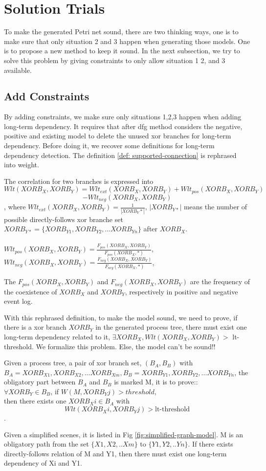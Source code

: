 \section{Solution Trials}
To make the generated Petri net sound, there are two thinking ways, one is to make sure that only situation 2 and 3 happen when generating those models. One is to propose a new method to keep it sound. 
In the next subsection, we try to solve this problem by giving constraints to only allow situation 1 2, and 3 available. 
\subsection{Add Constraints}
By adding constraints, we make sure only situations 1,2,3 happen when adding long-term dependency. It requires that after dfg method considers the negative, positive and existing model to delete the unused xor branches for long-term dependency. 
Before doing it, we recover some definitions for long-term dependency detection. 
The definition \ref{def: supported-connection} is rephrased into weight. 
\begin{definition} The correlation for two branches is expressed into
	\[Wlt(XORB_X,XORB_Y)= Wlt_{ext}(XORB_X, XORB_Y) + Wlt_{pos}(XORB_X, XORB_Y)\] \[ -Wlt_{neg}(XORB_X, XORB_Y)\], where 
	$Wlt_{ext}(XORB_X, XORB_Y)= \frac{1}{|XORB_Y*|}$, $|XORB_{Y*}|$ means the number of possible  directly-follows xor branche set $XORB_{Y*}=\{XORB_{Y1}, XORB_{Y2},...XORB_{Yn} \}$ after $XORB_X$. \\ \\
	$Wlt_{pos}(XORB_X, XORB_Y)= \frac{F_{pos}(XORB_X, XORB_Y)}{F_{pos}(XORB_X, *)}$, \\
	$Wlt_{neg}(XORB_X, XORB_Y)= \frac{F_{neg}(XORB_X, XORB_Y)}{F_{neg}(XORB_X, *)}$, \\	
\end{definition}
The $F_{pos}(XORB_X, XORB_Y)$ and $F_{neg}(XORB_X, XORB_Y)$ are the frequency of the coexistence of $XORB_X$ and $XORB_Y$, respectively in positive and negative event log.

With this rephrased definition, to make the model sound, we need to prove, if there is a xor branch $XORB_Y$ in the generated process tree, there must exist one long-term dependency related to it, $\exists XORB_X, Wlt(XORB_X,XORB_Y) >$ lt-threshold. We formalize this problem. Else, the model can't be sound!!
\begin{proposition}
	Given a process tree, a pair of xor branch set, $(B_A,B_B)$ with $B_A={XORB_{X1}, XORB_{X2},...XORB_{Xm}}, B_B={XORB_{Y1}, XORB_{Y2},...XORB_{Yn}}$, the obligatory part between $B_A$ and $B_B$ is marked M, it is to prove:: \\
	$\forall XORB_Y \in B_B$, if $W(M, XORB_Yj) > threshold$, \\ then there exists one $XORB_Xi \in B_A$ with 
	\[Wlt(XORB_Xi, XORB_Yj)> \text{lt-threshold}\]. 
\end{proposition}
Given a simplified scenes, it is listed in Fig \ref{fig:simplified-graph-model}. M is an obligatory path from the set $\{X1,X2,..Xm\}$ to $\{Y1,Y2,..Yn\}$. If there exists directly-follows relation of M and Y1, then there must exist one long-term dependency of Xi and Y1. 

